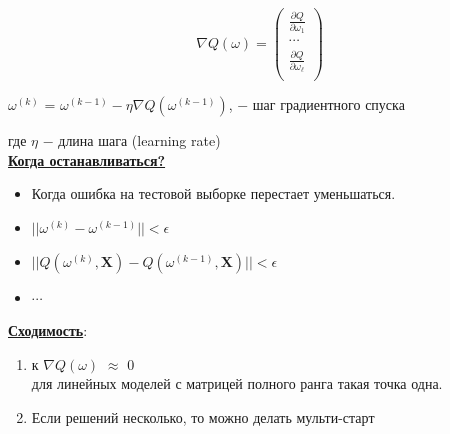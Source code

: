             \begin{center}
                \begin{equation}
                 \nabla Q(\omega) =
                    \begin{pmatrix}
                      \frac{\partial Q}{\partial \omega_1}\\
                      \cdots \\
                      \frac{\partial Q}{\partial \omega_\ell}\\
                    \end{pmatrix}
                \end{equation}
            \end{center}
           
            

            \begin{center}
                \large{$\omega^{(k)}$ = $\omega^{(k - 1)} - \eta \nabla Q(\omega^{(k - 1)})$}, $-$ шаг градиентного спуска\\
            \end{center}
            где $\eta$ $-$ длина шага (learning rate)\\

            \underline{\textbf{Когда останавливаться?}}
            \begin{itemize}
                \item Когда ошибка на тестовой выборке перестает уменьшаться.
                \item $||\omega^{(k)} - \omega^{(k - 1)}|| < \epsilon$
                \item $||Q(\omega^{(k)}, \mathbf{X}) - Q(\omega^{(k - 1)}, \mathbf{X})|| < \epsilon$
                \item $\cdots $\\
            \end{itemize}

            \underline{\textbf{Сходимость}}:
            \begin{enumerate}
                \item к $\nabla Q(\omega)$ $\approx$ $0$\\
                    для линейных моделей с матрицей полного ранга такая точка одна.

                
                \item Если решений несколько, то можно делать мульти-старт\\
            \end{enumerate}

